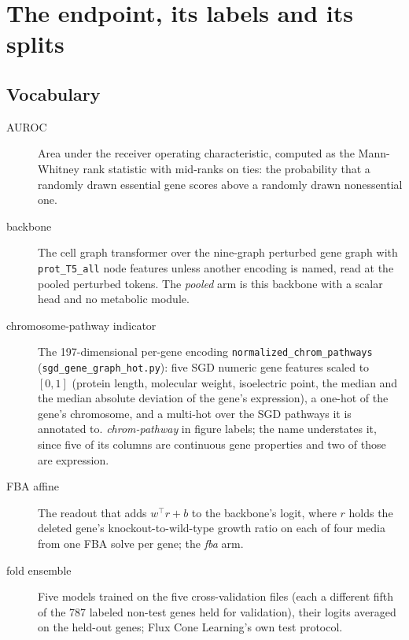 
\section{The endpoint, its labels and its splits}
\label{sec:endpoint}

\subsection{Vocabulary}

\begin{description}
  \item[AUROC] Area under the receiver operating characteristic, computed as the
    Mann-Whitney rank statistic with mid-ranks on ties: the probability that a randomly
    drawn essential gene scores above a randomly drawn nonessential one.
  \item[backbone] The cell graph transformer over the nine-graph perturbed gene graph with
    \texttt{prot\_T5\_all} node features unless another encoding is named, read at the
    pooled perturbed tokens. The \emph{pooled} arm is this backbone with a scalar head and
    no metabolic module.
  \item[chromosome-pathway indicator] The 197-dimensional per-gene encoding
    \texttt{normalized\_chrom\_pathways} (\texttt{sgd\_gene\_graph\_hot.py}): five SGD
    numeric gene features scaled to $[0, 1]$ (protein length, molecular weight,
    isoelectric point, the median and the median absolute deviation of the gene's
    expression), a one-hot of the gene's chromosome, and a multi-hot over the SGD
    pathways it is annotated to. \emph{chrom-pathway} in figure labels; the name
    understates it, since five of its columns are continuous gene properties and two of
    those are expression.
  \item[FBA affine] The readout that adds $w^\top r + b$ to the backbone's logit, where $r$
    holds the deleted gene's knockout-to-wild-type growth ratio on each of four media from
    one FBA solve per gene; the \emph{fba} arm.
  \item[fold ensemble] Five models trained on the five cross-validation files (each a
    different fifth of the 787 labeled non-test genes held for validation), their logits
    averaged on the held-out genes; Flux Cone Learning's own test protocol.

\end{description}
